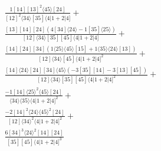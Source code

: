 \documentclass[varwidth, border=5pt]{standalone}
\begin{document}
\begin{my}
$\begin{gathered}
\scriptscriptstyle\frac{1[14][13]^2⟨45⟩[24]}{[12]^2⟨34⟩[35]⟨4|1+2|4]}+\\
\scriptscriptstyle\frac{[13][14][24](4[34]⟨24⟩-1[35]⟨25⟩)}{[12]⟨34⟩[35][45]⟨4|1+2|4]}+\\
\scriptscriptstyle\frac{[14][24][34](1⟨25⟩⟨45⟩[15]+1⟨35⟩⟨24⟩[13])}{[12]⟨34⟩[45]⟨4|1+2|4]^2}+\\
\scriptscriptstyle\frac{[14]⟨24⟩[24][34]⟨45⟩(-3[35][14]-3[13][45])}{[12]⟨34⟩[35][45]⟨4|1+2|4]^2}+\\
\scriptscriptstyle\frac{-1[14]⟨25⟩^2⟨45⟩[24]}{⟨34⟩⟨35⟩⟨4|1+2|4]^2}+\\
\scriptscriptstyle\frac{-2[14]^2⟨24⟩⟨45⟩^2[24]}{[12]⟨34⟩^2⟨4|1+2|4]^2}+\\
\scriptscriptstyle\frac{6[34]^3⟨24⟩^2[14][24]}{[35][45]⟨4|1+2|4]^3}\phantom{+}
\end{gathered}$
\end{my}
\end{document}
